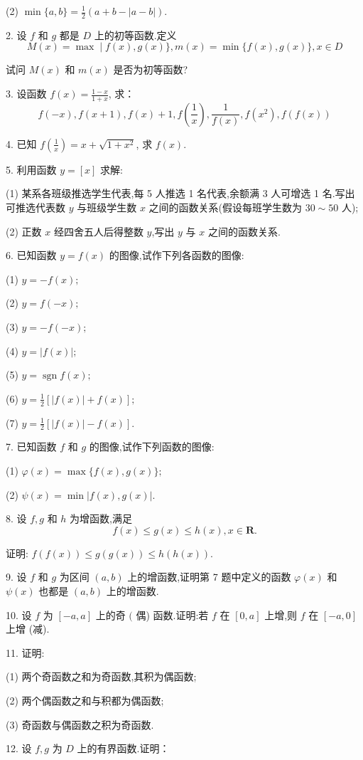 {(2) $\min \{a, b\}=\frac{1}{2}(a+b-|a-b|).$

2. 设 $f$ 和 $g$ 都是 $D$ 上的初等函数.定义
\[
M(x)=\max \mid f(x), g(x)\}, m(x)=\min \{f(x), g(x)\}, x \in D
\]

试问 $M(x)$ 和 $m(x)$ 是否为初等函数?

3. 设函数 $ f(x)=\frac{1-x}{1+x} $, 求：
\[
f(-x), f(x+1), f(x)+1, f\left(\frac{1}{x}\right), \frac{1}{f(x)}, f\left(x^{2}\right), f(f(x))
\]

4. 已知 $f\left(\frac{1}{x}\right)=x+\sqrt{1+x^{2}}$, 求 $f(x)$.

5. 利用函数 $y=[x]$ 求解:

(1) 某系各班级推选学生代表,每 5 人推选 1 名代表,余额满 3 人可增选 1 名.写出可推选代表数 $y$ 与班级学生数 $x$ 之间的函数关系(假设每班学生数为 $30 \sim 50$ 人);

(2) 正数 $x$ 经四舍五人后得整数 $y$,写出 $y$ 与 $x$ 之间的函数关系.

6. 已知函数 $y=f(x)$ 的图像,试作下列各函数的图像:

(1) $ y=-f(x) ;$

(2) $y=f(-x) ;$

(3) $y=-f(-x) ;$

(4) $y=|f(x)| ; $

(5) $y=\operatorname{sgn} f(x) ;$

(6) $ y=\frac{1}{2}[|f(x)|+f(x)] ;$

(7) $y=\frac{1}{2}[|f(x)|-f(x)]$.

7. 已知函数 $f$ 和 $g$ 的图像,试作下列函数的图像:

(1) $\varphi(x)=\max \{f(x), g(x)\} ; $

(2) $\psi(x)=\min |f(x), g(x)|.$

8. 设 $f, g$ 和 $h$ 为增函数,满足
\[
f(x) \leqslant g(x) \leqslant h(x), x \in \mathbf{R} .
\]

证明: $f(f(x)) \leqslant g(g(x)) \leqslant h(h(x))$.

9. 设 $f$ 和 $g$ 为区间 $(a, b)$ 上的增函数,证明第 7 题中定义的函数 $\varphi(x)$ 和 $\psi(x)$ 也都是 $(a, b)$ 上的增函数.

10. 设 $f$ 为 $[-a, a]$ 上的奇 $($ 偶) 函数.证明:若 $f$ 在 $[0, a]$ 上增,则 $f$ 在 $[-a, 0]$ 上增 (减).

11. 证明:

(1) 两个奇函数之和为奇函数,其积为偶函数;

(2) 两个偶函数之和与积都为偶函数;

(3) 奇函数与偶函数之积为奇函数.

12. 设 $f, g$ 为 $D$ 上的有界函数.证明：

}
